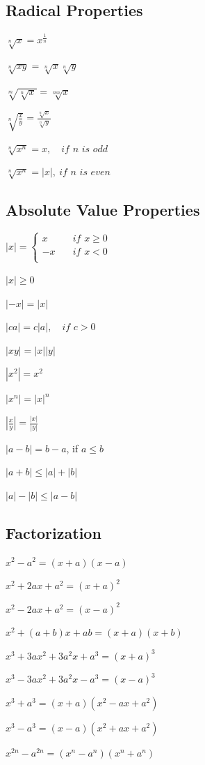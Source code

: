 \documentclass[8pt,a4paper]{extarticle}     %
\theoremstyle{definition}
\theoremstyle{definition}
\theoremstyle{definition}
\begin{document}
\begin{multicols}{4}
\subsection{Radical Properties}
\begin{eqlist}
	\item $\sqrt[n]{x} = x^{\frac{1}{n}}$ 
	\item $\sqrt[n]{xy} = \sqrt[n]{x}\sqrt[n]{y}$
	\item $\sqrt[m]{\sqrt[n]{x}} = \sqrt[mn]{x}$
	\item $\sqrt[n]{\frac{x}{y}} = \frac{\sqrt[n]{x}}{\sqrt[n]{y}}$
	\item $\sqrt[n]{x^n} = x, \quad \textit{if $n$ is odd}$
	\item $\sqrt[n]{x^n} = |x|, \ \textit{if $n$ is even}$
\end{eqlist}

\subsection{Absolute Value Properties} 
\begin{eqlist}
	\item $|x| = \begin{cases}
			x &\quad \textit{if $x \geq 0$}\\
			-x &\quad \textit{if $x < 0$}\\
		\end{cases} $
	\item $|x| \geq 0$
	\item $|-x| = |x|$
	\item $|ca| = c|a|, \quad \textit{if $c > 0$}$
	\item $|xy| = |x||y|$
	\item $|x^2| = x^2$
	\item $|x^n| = |x|^n$
	\item $\left|\frac{x}{y}\right| = \frac{|x|}{|y|}$
	\item $|a-b| = b-a$, if $a\leq b$
	\item $|a+b| \leq |a| + |b|$
	\item $|a|-|b| \leq |a-b|$ 
\end{eqlist}

\subsection{Factorization}
\begin{eqlist}
	\item $x^2-a^2 = (x+a)(x-a)$
	\item $x^2+2ax+a^2 = (x+a)^2$
	\item $x^2-2ax+a^2 = (x-a)^2$
	\item $x^2+(a+b)x+ab = (x+a)(x+b)$
	\item $x^3+3ax^2+3a^2x+a^3 = (x+a)^3$
	\item $x^3-3ax^2+3a^2x-a^3 = (x-a)^3$
	\item $x^3+a^3=(x+a)(x^2-ax+a^2)$
	\item $x^3-a^3=(x-a)(x^2+ax+a^2)$
	\item $x^{2n}-a^{2n}=(x^n-a^n)(x^n+a^n)$
\end{eqlist}


\end{multicols}
\end{document}

